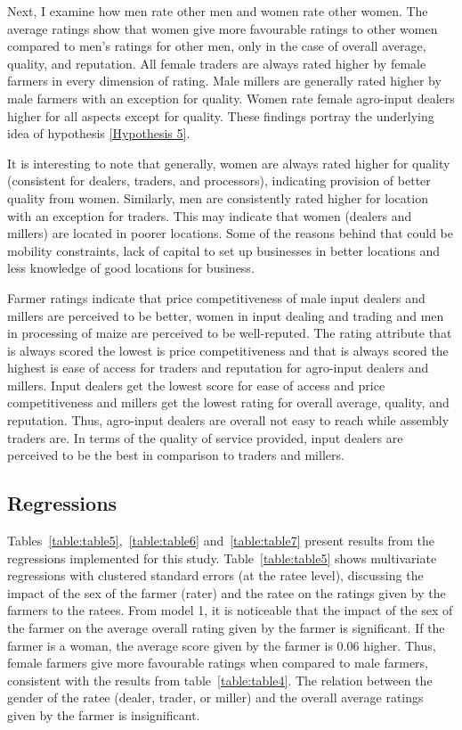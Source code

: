 \documentclass[12pt,english]{article}\usepackage[]{graphicx}\usepackage[]{color}
\begin{document}
Next, I examine how men rate other men and women rate other women.
The average ratings show that women give more favourable ratings to
other women compared to men's ratings for other men, only in the case
of overall average, quality, and reputation. All female traders are
always rated higher by female farmers in every dimension of rating.
Male millers are generally rated higher by male farmers with an exception
for quality. Women rate female agro-input dealers higher for all aspects
except for quality. These findings portray the underlying idea of
hypothesis \ref{Hypothesis 5}.

It is interesting to note that generally, women are always rated higher
for quality (consistent for dealers, traders, and processors), indicating
provision of better quality from women. Similarly, men are consistently
rated higher for location with an exception for traders. This may
indicate that women (dealers and millers) are located in poorer locations.
Some of the reasons behind that could be mobility constraints, lack
of capital to set up businesses in better locations and less knowledge
of good locations for business. 

Farmer ratings indicate that price competitiveness of male input dealers
and millers are perceived to be better, women in input dealing and
trading and men in processing of maize are perceived to be well-reputed.
The rating attribute that is always scored the lowest is price competitiveness
and that is always scored the highest is ease of access for traders
and reputation for agro-input dealers and millers. Input dealers get
the lowest score for ease of access and price competitiveness and
millers get the lowest rating for overall average, quality, and reputation.
Thus, agro-input dealers are overall not easy to reach while assembly
traders are. In terms of the quality of service provided, input dealers
are perceived to be the best in comparison to traders and millers. 
\begin{onehalfspace}

\subsection{Regressions\label{subsec:Regressions}}
\end{onehalfspace}

Tables~\ref{table:table5},~\ref{table:table6} and~\ref{table:table7}
present results from the regressions implemented for this study. Table~\ref{table:table5}
shows multivariate regressions with clustered standard errors (at
the ratee level), discussing the impact of the sex of the farmer (rater)
and the ratee on the ratings given by the farmers to the ratees. From
model 1, it is noticeable that the impact of the sex of the farmer
on the average overall rating given by the farmer is significant.
If the farmer is a woman, the average score given by the farmer is
0.06
higher. Thus, female farmers give more favourable ratings when compared
to male farmers, consistent with the results from table~\ref{table:table4}.
The relation between the gender of the ratee (dealer, trader, or miller)
and the overall average ratings given by the farmer is insignificant. 
\end{document}
